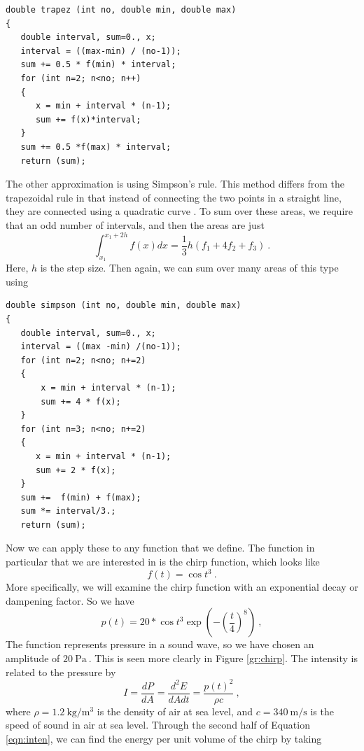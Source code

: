 \documentclass[aps,prl,twocolumn,superscriptaddress]{revtex4-1}
\newcommand{\paren}[1]{\left( #1 \right)} 	%
\begin{document}
\begin{lstlisting}
double trapez (int no, double min, double max)
{			
   double interval, sum=0., x;		 
   interval = ((max-min) / (no-1));
   sum += 0.5 * f(min) * interval;
   for (int n=2; n<no; n++)
   {
      x = min + interval * (n-1);      
      sum += f(x)*interval;
   }
   sum += 0.5 *f(max) * interval;
   return (sum);
\end{lstlisting}
The other approximation is using Simpson's rule. This method differs from the trapezoidal rule in that instead of connecting the two points in a straight line, they are connected using a quadratic curve \cite{simp}. To sum over these areas, we require that an odd number of intervals, and then the areas are just
\begin{equation}
\int_{x_1}^{x_1 + 2 h} f(x) dx = \frac{1}{3} h \paren{f_1 + 4 f_2 + f_3} ~. \label{eqn:simp} 
\end{equation}
Here, $h$ is the step size. Then again, we can sum over many areas of this type using
\begin{lstlisting}
double simpson (int no, double min, double max)
{  				 
   double interval, sum=0., x;
   interval = ((max -min) /(no-1));
   for (int n=2; n<no; n+=2)
   {
       x = min + interval * (n-1);
       sum += 4 * f(x);
   }
   for (int n=3; n<no; n+=2)
   {
      x = min + interval * (n-1);
      sum += 2 * f(x);
   }   
   sum +=  f(min) + f(max);
   sum *= interval/3.;
   return (sum);
\end{lstlisting}
Now we can apply these to any function that we define. The function in particular that we are interested in is the chirp function, which looks like
\begin{equation}
f(t) = \cos t^3	~.	\label{eqn:chirp}
\end{equation}
More specifically, we will examine the chirp function with an exponential decay or dampening factor. So we have
\begin{equation}
p(t) = 20*\cos t^3 \exp \paren{-\paren{\frac{t}{4}}^8} ~, \label{eqn:chirpe}
\end{equation} 
The function represents pressure in a sound wave, so we have chosen an amplitude of $\SI{20}{\pascal}~$. This is seen more clearly in Figure \ref{gr:chirp}. The intensity is related to the pressure by \cite{inten}
\begin{equation}
I = \frac{dP}{dA} = \frac{d^2 E}{dA dt} = \frac{p(t)^2}{\rho c} ~, \label{eqn:inten}
\end{equation}
where $\rho = \SI{1.2}{\kg\per\m\cubed}$ is the density of air at sea level, and $c = \SI{340}{\m\per\s}$ is the speed of sound in air at sea level. Through the second half of Equation \ref{eqn:inten}, we can find the energy per unit volume of the chirp by taking
\end{document}
